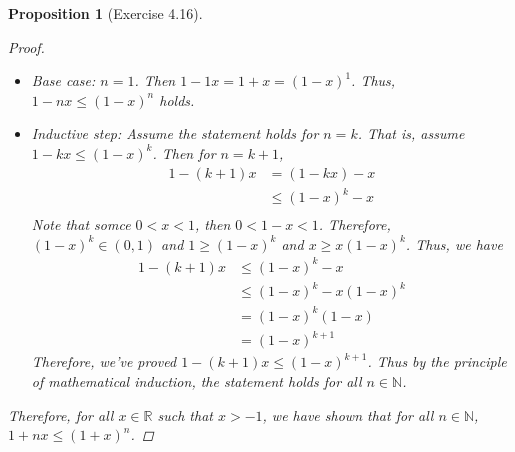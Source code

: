 \documentclass[12pt]{article}
\newcommand{\N}{\mathbb{N}} %
\newcommand{\R}{\mathbb{R}} %
\newtheorem{proposition}{Proposition}
\begin{document}
\begin{proposition}[Exercise 4.16]
\begin{proof}
\begin{itemize}
\begin{itemize}
              \item Base case: $n = 1$. Then $1 - 1x = 1 + x = (1 - x)^1$.
                    Thus, $1 - nx \le (1 - x)^n$ holds.
              \item Inductive step: Assume the statement holds for $n = k$.
                    That is, assume $1 - kx \le (1 - x)^k$.
                    Then for $n = k + 1$,
                    \begin{align*}
                      1 - (k + 1)x & = (1 - kx) - x    \\
                                   & \le (1 - x)^k - x \\
                    \end{align*}
                    Note that somce $0 < x < 1$, then $0 < 1 - x < 1$.
                    Therefore, $(1 - x)^k \in (0, 1)$ and $1 \ge (1 - x)^k$ and $x \ge x(1 - x)^k$.
                    Thus, we have
                    \begin{align*}
                      1 - (k + 1)x & \le (1 - x)^k - x          \\
                                   & \le (1 - x)^k - x(1 - x)^k \\
                                   & = (1 - x)^k(1 - x)         \\
                                   & = (1 - x)^{k + 1}
                    \end{align*}
                    Therefore, we've proved $1 - (k + 1)x \le (1 - x)^{k + 1}$.
                    Thus by the principle of mathematical induction, the statement holds for all $n \in \N$.
            \end{itemize}
    \end{itemize}
    Therefore, for all $x \in \R$ such that $x > -1$, we have shown that for all $n \in \N$, $1 + nx \le (1 + x)^n$.
  \end{proof}
\end{proposition}


\end{document}

